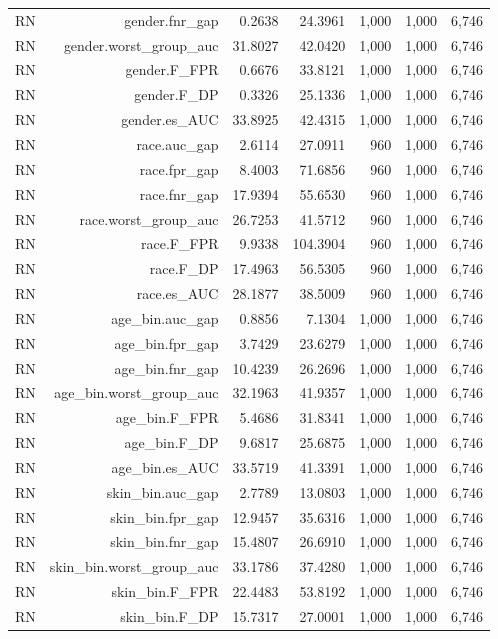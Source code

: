 \documentclass[10pt]{article}
\begin{document}
\begin{longtable}{@{}lrrrrrr@{}}
RN & gender.fnr\_gap & 0.2638 & 24.3961 & 1,000 & 1,000 & 6,746 \\
RN & gender.worst\_group\_auc & 31.8027 & 42.0420 & 1,000 & 1,000 & 6,746 \\
RN & gender.F\_FPR & 0.6676 & 33.8121 & 1,000 & 1,000 & 6,746 \\
RN & gender.F\_DP & 0.3326 & 25.1336 & 1,000 & 1,000 & 6,746 \\
RN & gender.es\_AUC & 33.8925 & 42.4315 & 1,000 & 1,000 & 6,746 \\
RN & race.auc\_gap & 2.6114 & 27.0911 & 960 & 1,000 & 6,746 \\
RN & race.fpr\_gap & 8.4003 & 71.6856 & 960 & 1,000 & 6,746 \\
RN & race.fnr\_gap & 17.9394 & 55.6530 & 960 & 1,000 & 6,746 \\
RN & race.worst\_group\_auc & 26.7253 & 41.5712 & 960 & 1,000 & 6,746 \\
RN & race.F\_FPR & 9.9338 & 104.3904 & 960 & 1,000 & 6,746 \\
RN & race.F\_DP & 17.4963 & 56.5305 & 960 & 1,000 & 6,746 \\
RN & race.es\_AUC & 28.1877 & 38.5009 & 960 & 1,000 & 6,746 \\
RN & age\_bin.auc\_gap & 0.8856 & 7.1304 & 1,000 & 1,000 & 6,746 \\
RN & age\_bin.fpr\_gap & 3.7429 & 23.6279 & 1,000 & 1,000 & 6,746 \\
RN & age\_bin.fnr\_gap & 10.4239 & 26.2696 & 1,000 & 1,000 & 6,746 \\
RN & age\_bin.worst\_group\_auc & 32.1963 & 41.9357 & 1,000 & 1,000 & 6,746 \\
RN & age\_bin.F\_FPR & 5.4686 & 31.8341 & 1,000 & 1,000 & 6,746 \\
RN & age\_bin.F\_DP & 9.6817 & 25.6875 & 1,000 & 1,000 & 6,746 \\
RN & age\_bin.es\_AUC & 33.5719 & 41.3391 & 1,000 & 1,000 & 6,746 \\
RN & skin\_bin.auc\_gap & 2.7789 & 13.0803 & 1,000 & 1,000 & 6,746 \\
RN & skin\_bin.fpr\_gap & 12.9457 & 35.6316 & 1,000 & 1,000 & 6,746 \\
RN & skin\_bin.fnr\_gap & 15.4807 & 26.6910 & 1,000 & 1,000 & 6,746 \\
RN & skin\_bin.worst\_group\_auc & 33.1786 & 37.4280 & 1,000 & 1,000 & 6,746 \\
RN & skin\_bin.F\_FPR & 22.4483 & 53.8192 & 1,000 & 1,000 & 6,746 \\
RN & skin\_bin.F\_DP & 15.7317 & 27.0001 & 1,000 & 1,000 & 6,746 \\

\end{longtable}
\end{document}
